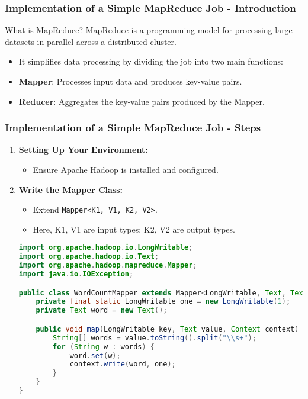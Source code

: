 \documentclass[aspectratio=169]{beamer}
\begin{document}
\begin{frame}[fragile]
    \frametitle{Implementation of a Simple MapReduce Job - Introduction}
    \begin{block}{What is MapReduce?}
        MapReduce is a programming model for processing large datasets in parallel across a distributed cluster.
        \begin{itemize}
            \item It simplifies data processing by dividing the job into two main functions:
            \item \textbf{Mapper}: Processes input data and produces key-value pairs.
            \item \textbf{Reducer}: Aggregates the key-value pairs produced by the Mapper.
        \end{itemize}
    \end{block}
\end{frame}

\begin{frame}[fragile]
    \frametitle{Implementation of a Simple MapReduce Job - Steps}
    \begin{enumerate}
        \item \textbf{Setting Up Your Environment:}
          \begin{itemize}
            \item Ensure Apache Hadoop is installed and configured.
          \end{itemize}
        
        \item \textbf{Write the Mapper Class:}
          \begin{itemize}
            \item Extend \texttt{Mapper<K1, V1, K2, V2>}.
            \item Here, K1, V1 are input types; K2, V2 are output types.
          \end{itemize}
        \begin{lstlisting}[language=Java]
import org.apache.hadoop.io.LongWritable;
import org.apache.hadoop.io.Text;
import org.apache.hadoop.mapreduce.Mapper;
import java.io.IOException;

public class WordCountMapper extends Mapper<LongWritable, Text, Text, LongWritable> {
    private final static LongWritable one = new LongWritable(1);
    private Text word = new Text();

    public void map(LongWritable key, Text value, Context context) throws IOException, InterruptedException {
        String[] words = value.toString().split("\\s+");
        for (String w : words) {
            word.set(w);
            context.write(word, one);
        }
    }
}
          \end{lstlisting}
    \end{enumerate}
\end{frame}
\end{document}
